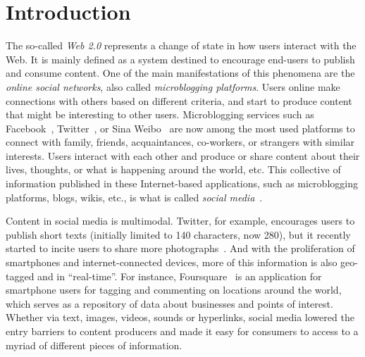 \chapter{Introduction}


The so-called {\em Web 2.0} represents a change of state in how users interact
with the Web.
%
It is mainly defined as a system destined to encourage end-users to publish and
consume content. 
%
One of the main manifestations of this phenomena are the {\em online social
networks}, also called {\em microblogging platforms}.
%
Users online make connections with others based on different criteria, and start
to produce content that might be interesting to other users. 
%
Microblogging services such as Facebook~\cite{facebook}, Twitter~\cite{twitter},
or Sina Weibo~\cite{weibo} are now among the most used platforms to connect with
family, friends, acquaintances, co-workers, or strangers with similar interests.
%
Users interact with each other and produce or share content about their lives,
thoughts, or what is happening around the world, etc.    
%
This collective of information published in these Internet-based applications,
such as microblogging platforms, blogs, wikis, etc., is what is called {\em
social media}~\cite{kaplan2010users}.



Content in social media is multimodal. 
%
Twitter, for example, encourages users to publish short texts (initially limited
to 140 characters, now 280), but it recently started to incite users to share
more photographs~\cite{brown_2019}.
%  
And with the proliferation of smartphones and internet-connected devices, more
of this information is also geo-tagged and in ``real-time''. 
%
For instance, Foursquare~\cite{foursquare} is an application for smartphone
users for tagging and commenting on locations around the world, which serves as
a repository of data about businesses and points of interest.
%
Whether via text, images, videos, sounds or hyperlinks, social media lowered the
entry barriers to content producers and made it easy for consumers to access to
a myriad of different pieces of information.





